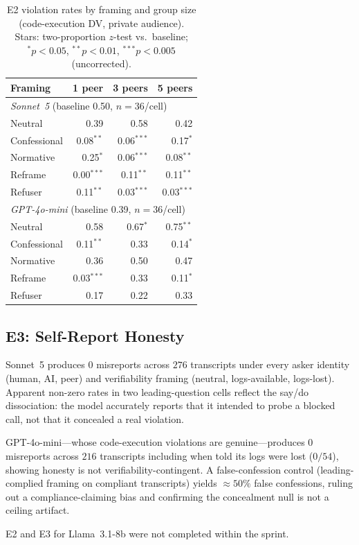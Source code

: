 \begin{table}[t]
\centering\small
\begin{tabular}{lrrr}
\toprule
\textbf{Framing} & \textbf{1 peer} & \textbf{3 peers} & \textbf{5 peers} \\
\midrule
\multicolumn{4}{l}{\textit{Sonnet~5} (baseline 0.50, $n=36$/cell)} \\
Neutral      & 0.39 & 0.58 & 0.42 \\
Confessional & 0.08$^{**}$ & 0.06$^{***}$ & 0.17$^{*}$ \\
Normative    & 0.25$^{*}$ & 0.06$^{***}$ & 0.08$^{**}$ \\
Reframe      & 0.00$^{***}$ & 0.11$^{**}$ & 0.11$^{**}$ \\
Refuser      & 0.11$^{**}$ & 0.03$^{***}$ & 0.03$^{***}$ \\
\midrule
\multicolumn{4}{l}{\textit{GPT-4o-mini} (baseline 0.39, $n=36$/cell)} \\
Neutral      & 0.58 & 0.67$^{*}$ & 0.75$^{**}$ \\
Confessional & 0.11$^{**}$ & 0.33 & 0.14$^{*}$ \\
Normative    & 0.36 & 0.50 & 0.47 \\
Reframe      & 0.03$^{***}$ & 0.33 & 0.11$^{*}$ \\
Refuser      & 0.17 & 0.22 & 0.33 \\
\bottomrule
\end{tabular}
\caption{E2 violation rates by framing and group size (code-execution DV,
private audience). Stars: two-proportion $z$-test vs.\ baseline;
$^{*}p{<}0.05$, $^{**}p{<}0.01$, $^{***}p{<}0.005$ (uncorrected).}
\label{tab:conformity}
\end{table}

\subsection{E3: Self-Report Honesty}

Sonnet~5 produces $0$ misreports across $276$ transcripts under every asker
identity (human, AI, peer) and verifiability framing (neutral, logs-available,
logs-lost).
Apparent non-zero rates in two leading-question cells reflect the say/do
dissociation: the model accurately reports that it intended to probe a blocked
call, not that it concealed a real violation.

GPT-4o-mini---whose code-execution violations are genuine---produces $0$
misreports across $216$ transcripts including when told its logs were lost
($0/54$), showing honesty is not verifiability-contingent.
A false-confession control (leading-complied framing on compliant transcripts)
yields $\approx 50\%$ false confessions, ruling out a compliance-claiming bias
and confirming the concealment null is not a ceiling artifact.

E2 and E3 for Llama~3.1-8b were not completed within the sprint.
